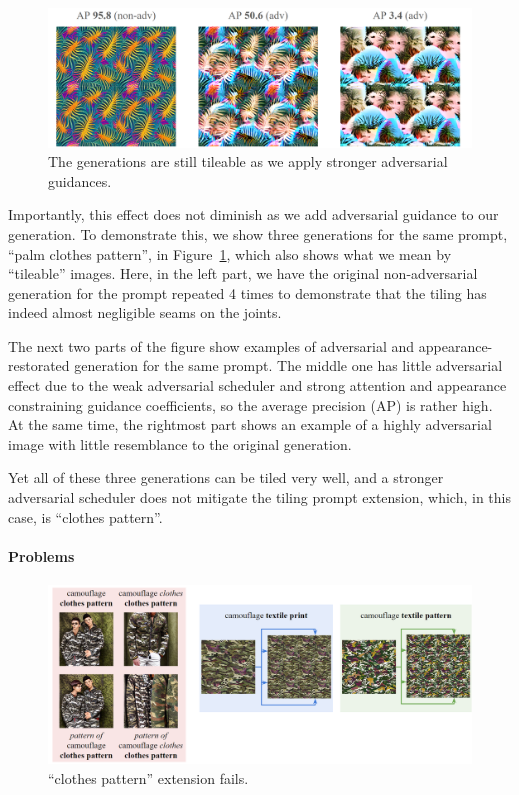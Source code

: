 \begin{figure}[htp]
\centering
\includegraphics[width=150mm]{figures/adv_vs_tiling.png}
\caption{The generations are still tileable as we apply stronger adversarial guidances.}
\label{tiling_vs_adv}
\end{figure}

Importantly, this effect does not diminish as we add adversarial guidance to our generation.
To demonstrate this, we show three generations for the same prompt, ``palm clothes pattern'', in Figure~\ref{tiling_vs_adv}, which also shows what we mean by ``tileable'' images.
Here, in the left part, we have the original non-adversarial generation for the prompt repeated 4 times to demonstrate that the tiling has indeed almost negligible seams on the joints.

The next two parts of the figure show examples of adversarial and appearance-restorated generation for the same prompt. 
The middle one has little adversarial effect due to the weak adversarial scheduler and strong attention and appearance constraining guidance coefficients, so the average precision (AP) is rather high.
At the same time, the rightmost part shows an example of a highly adversarial image with little resemblance to the original generation. 

Yet all of these three generations can be tiled very well, and a stronger adversarial scheduler does not mitigate the tiling prompt extension, which, in this case, is ``clothes pattern''.

\paragraph{Problems}

\begin{figure}[htp]
\centering
\includegraphics[width=150mm]{figures/clothes_pattern_fails.png}
\caption{``clothes pattern'' extension fails.}
\label{clothes_pattern_fails}
\end{figure}

